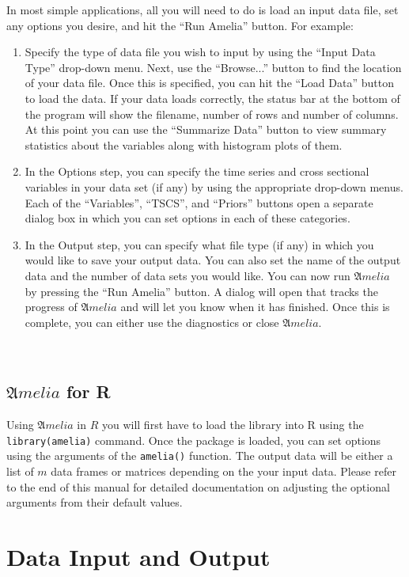 \documentclass[12pt,titlepage]{article}
\newcommand{\Amelia}{\ensuremath{\mathfrak Amelia} }
\begin{document}
In most simple applications, all you will need to do is load an input
data file, set any options you desire, and hit the ``Run Amelia''
button.  For example:
\begin{enumerate}
\item Specify the type of data file you wish to input by using the
  ``Input Data Type'' drop-down menu.  Next, use the ``Browse...''
  button to find the location of your data file.  Once this is
  specified, you can hit the ``Load Data'' button to load the data.
  If your data loads correctly, the status bar at the bottom of the
  program will show the filename, number of rows and number of
  columns.  At this point you can use the ``Summarize Data'' button to
  view summary statistics about the variables along with histogram
  plots of them.
\item In the Options step, you can specify the time series and cross
  sectional variables in your data set (if any) by using the
  appropriate drop-down menus.  Each of the ``Variables'', ``TSCS'',
  and ``Priors'' buttons open a separate dialog box in which you can
  set options in each of these categories.
\item In the Output step, you can specify what file type (if any) in
  which you would like to save your output data.  You can also set the
  name of the output data and the number of data sets you would like.
  You can now run ${\mathfrak Amelia}$ by pressing the ``Run Amelia''
  button.  A dialog will open that tracks the progress of ${\mathfrak
    Amelia}$ and will let you know when it has finished.  Once this is
  complete, you can either use the diagnostics or close ${\mathfrak
    Amelia}$.
\end{enumerate}

\ 
\subsection{\Amelia for R}
\label{sec:roverview}
Using \Amelia in $R$ you will first have to load the library into R
using the \texttt{library(amelia)} command.  Once the package is
loaded, you can set options using the arguments of the
\texttt{amelia()} function.  The output data will be either a list of
$m$ data frames or matrices depending on the your input data.  Please
refer to the end of this manual for detailed documentation on
adjusting the optional arguments from their default values.

\section{Data Input and Output}
\label{sec:data}
\end{document}
